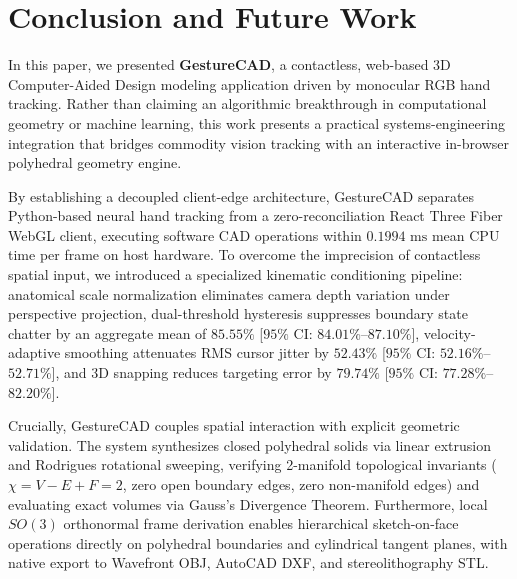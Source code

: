 \section{Conclusion and Future Work}
\label{sec:conclusion}

In this paper, we presented \textbf{GestureCAD}, a contactless, web-based 3D Computer-Aided Design modeling application driven by monocular RGB hand tracking. Rather than claiming an algorithmic breakthrough in computational geometry or machine learning, this work presents a practical systems-engineering integration that bridges commodity vision tracking with an interactive in-browser polyhedral geometry engine.

By establishing a decoupled client-edge architecture, GestureCAD separates Python-based neural hand tracking from a zero-reconciliation React Three Fiber WebGL client, executing software CAD operations within $0.1994\text{ ms}$ mean CPU time per frame on host hardware. To overcome the imprecision of contactless spatial input, we introduced a specialized kinematic conditioning pipeline: anatomical scale normalization eliminates camera depth variation under perspective projection, dual-threshold hysteresis suppresses boundary state chatter by an aggregate mean of $85.55\%$ [$95\%$ CI: $84.01\%$–$87.10\%$], velocity-adaptive smoothing attenuates RMS cursor jitter by $52.43\%$ [$95\%$ CI: $52.16\%$–$52.71\%$], and 3D snapping reduces targeting error by $79.74\%$ [$95\%$ CI: $77.28\%$–$82.20\%$].

Crucially, GestureCAD couples spatial interaction with explicit geometric validation. The system synthesizes closed polyhedral solids via linear extrusion and Rodrigues rotational sweeping, verifying 2-manifold topological invariants ($\chi = V - E + F = 2$, zero open boundary edges, zero non-manifold edges) and evaluating exact volumes via Gauss's Divergence Theorem. Furthermore, local $SO(3)$ orthonormal frame derivation enables hierarchical sketch-on-face operations directly on polyhedral boundaries and cylindrical tangent planes, with native export to Wavefront OBJ, AutoCAD DXF, and stereolithography STL.

